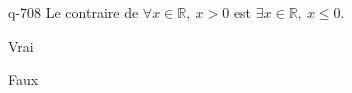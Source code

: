 \begin{truefalse}{q-708}
Le contraire de $\forall x \in \mathbb R,\: x>0$ est $\exists x \in \mathbb R,\: x\leq 0$.
\item* Vrai
\item Faux
\end{truefalse}

